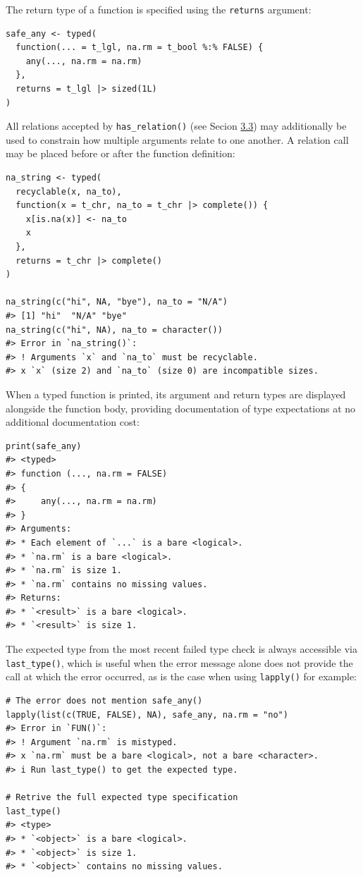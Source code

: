 The return type of a function is specified using the \texttt{returns} argument:

\begin{verbatim}
safe_any <- typed(
  function(... = t_lgl, na.rm = t_bool %:% FALSE) {
    any(..., na.rm = na.rm)
  },
  returns = t_lgl |> sized(1L)
)
\end{verbatim}

All relations accepted by \texttt{has\_relation()} (see Secion \hyperref[sec-structural-type]{3.3}) may additionally be used to constrain how multiple arguments relate to one another. A relation call may be placed before or after the function definition:

\begin{verbatim}
na_string <- typed(
  recyclable(x, na_to),
  function(x = t_chr, na_to = t_chr |> complete()) {
    x[is.na(x)] <- na_to
    x
  },
  returns = t_chr |> complete()
)

na_string(c("hi", NA, "bye"), na_to = "N/A")
#> [1] "hi"  "N/A" "bye"
na_string(c("hi", NA), na_to = character())
#> Error in `na_string()`:
#> ! Arguments `x` and `na_to` must be recyclable.
#> x `x` (size 2) and `na_to` (size 0) are incompatible sizes.
\end{verbatim}

When a typed function is printed, its argument and return types are displayed alongside the function body, providing documentation of type expectations at no additional documentation cost:

\begin{verbatim}
print(safe_any)
#> <typed>
#> function (..., na.rm = FALSE) 
#> {
#>     any(..., na.rm = na.rm)
#> }
#> Arguments:
#> * Each element of `...` is a bare <logical>.
#> * `na.rm` is a bare <logical>.
#> * `na.rm` is size 1.
#> * `na.rm` contains no missing values.
#> Returns:
#> * `<result>` is a bare <logical>.
#> * `<result>` is size 1.
\end{verbatim}

The expected type from the most recent failed type check is always accessible via \texttt{last\_type()}, which is useful when the error message alone does not provide the call at which the error occurred, as is the case when using \texttt{lapply()} for example:

\begin{verbatim}
# The error does not mention safe_any()
lapply(list(c(TRUE, FALSE), NA), safe_any, na.rm = "no")
#> Error in `FUN()`:
#> ! Argument `na.rm` is mistyped.
#> x `na.rm` must be a bare <logical>, not a bare <character>.
#> i Run last_type() to get the expected type.

# Retrive the full expected type specification
last_type()
#> <type>
#> * `<object>` is a bare <logical>.
#> * `<object>` is size 1.
#> * `<object>` contains no missing values.
\end{verbatim}

